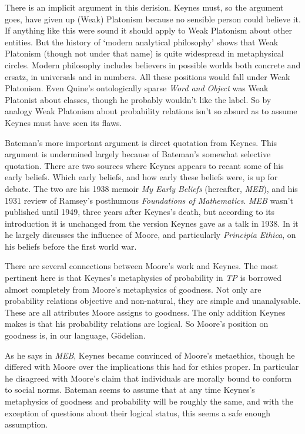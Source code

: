 There is an implicit argument in this derision. Keynes must, so the argument goes, have given up (Weak) Platonism because no sensible person could believe it. If anything like this were sound it should apply to Weak Platonism about other entities. But the history of `modern analytical philosophy' shows that Weak Platonism (though not under that name) is quite widespread in metaphysical circles. Modern philosophy includes believers in possible worlds both concrete and ersatz, in universals and in numbers. All these positions would fall under Weak Platonism. Even Quine's ontologically sparse \textit{Word and Object} was Weak Platonist about classes, though he probably wouldn't like the label. So by analogy Weak Platonism about probability relations isn't so absurd as to assume Keynes must have seen its flaws.

Bateman's more important argument is direct quotation from Keynes. This argument is undermined largely because of Bateman's somewhat selective quotation. There are two sources where Keynes appears to recant some of his early beliefs. Which early beliefs, and how early these beliefs were, is up for debate. The two are his 1938 memoir \textit{My Early Beliefs }(hereafter, \textit{MEB}), and his 1931 review of Ramsey's posthumous \textit{Foundations of Mathematics}. \textit{MEB} wasn't published until 1949, three years after Keynes's death, but according to its introduction it is unchanged from the version Keynes gave as a talk in 1938. In it he largely discusses the influence of Moore, and particularly \textit{Principia Ethica}, on his beliefs before the first world war.

There are several connections between Moore's work and Keynes. The most pertinent here is that Keynes's metaphysics of probability in \textit{TP} is borrowed almost completely from Moore's metaphysics of goodness. Not only are probability relations objective and non-natural, they are simple and unanalysable. These are all attributes Moore assigns to goodness. The only addition Keynes makes is that his probability relations are logical. So Moore's position on goodness is, in our language, G\"{o}delian.

As he says in \textit{MEB}, Keynes became convinced of Moore's metaethics, though he differed with Moore over the implications this had for ethics proper. In particular he disagreed with Moore's claim that individuals are morally bound to conform to social norms. Bateman seems to assume that at any time Keynes's metaphysics of goodness and probability will be roughly the same, and with the exception of questions about their logical status, this seems a safe enough assumption.

